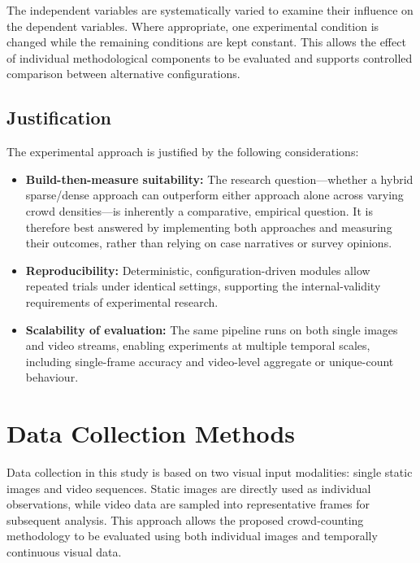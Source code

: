 \documentclass[12pt,a4paper]{report}
\begin{document}
The independent variables are systematically varied to examine their influence
on the dependent variables. Where appropriate, one experimental condition is
changed while the remaining conditions are kept constant. This allows the
effect of individual methodological components to be evaluated and supports
controlled comparison between alternative configurations.

\subsection{Justification}

The experimental approach is justified by the following considerations:

\begin{itemize}
    \item \textbf{Build-then-measure suitability:} 
    The research question---whether a hybrid sparse/dense approach can 
    outperform either approach alone across varying crowd densities---is 
    inherently a comparative, empirical question. It is therefore best 
    answered by implementing both approaches and measuring their outcomes, 
    rather than relying on case narratives or survey opinions.

    \item \textbf{Reproducibility:} 
    Deterministic, configuration-driven modules allow repeated trials under 
    identical settings, supporting the internal-validity requirements of 
    experimental research.

    \item \textbf{Scalability of evaluation:} 
    The same pipeline runs on both single images and video streams, enabling 
    experiments at multiple temporal scales, including single-frame accuracy 
    and video-level aggregate or unique-count behaviour.
\end{itemize}

\section{Data Collection Methods}

Data collection in this study is based on two visual input modalities:
single static images and video sequences. Static images are directly used as
individual observations, while video data are sampled into representative
frames for subsequent analysis. This approach allows the proposed
crowd-counting methodology to be evaluated using both individual images and
temporally continuous visual data.
\end{document}
